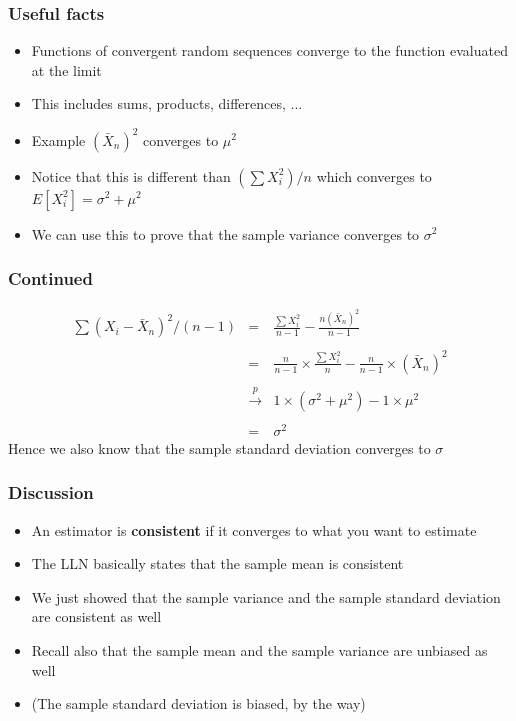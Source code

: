 \documentclass[aspectratio=169]{beamer}
\begin{document}
\begin{frame}\frametitle{Useful facts}
  \begin{itemize}
  \item Functions of convergent random sequences converge to 
    the function evaluated at the limit
  \item This includes sums, products, differences, ...
  \item Example $(\bar X_n) ^2$ converges to $\mu^2$
  \item Notice that this is different than $(\sum X_i^2) / n$ which converges
    to $E[X_i^2] = \sigma^2 + \mu^2$
  \item We can use this to prove that the sample variance converges to
    $\sigma^2$
  \end{itemize}
\end{frame}

\begin{frame}\frametitle{Continued}
  \begin{eqnarray*}
    \sum (X_i - \bar X_n)^2 / (n - 1) & =  & \frac{\sum X_i^2}{n - 1}  - \frac{n (\bar X_n)^2}{n - 1}  \\ \\
    & = & \frac{n}{n-1}\times \frac{\sum X_i^2}{n} - \frac{n}{n-1} \times (\bar X_n)^ 2\\ \\
    & \stackrel{p}{\rightarrow} & 1 \times (\sigma^2 + \mu^2) - 1 \times \mu^2 \\ \\
    & = & \sigma^2 
  \end{eqnarray*}
  Hence we also know that the sample standard deviation converges to
  $\sigma$
\end{frame}

\begin{frame}\frametitle{Discussion}
  \begin{itemize}
  \item An estimator is {\bf consistent} if it converges to what you want to estimate
  \item The LLN basically states that the sample mean is consistent
  \item We just showed that the sample variance and the sample standard deviation are
    consistent as well
  \item Recall also that the sample mean and the sample variance are unbiased as well
  \item (The sample standard deviation is biased, by the way)
  \end{itemize}
\end{frame}
\end{document}

